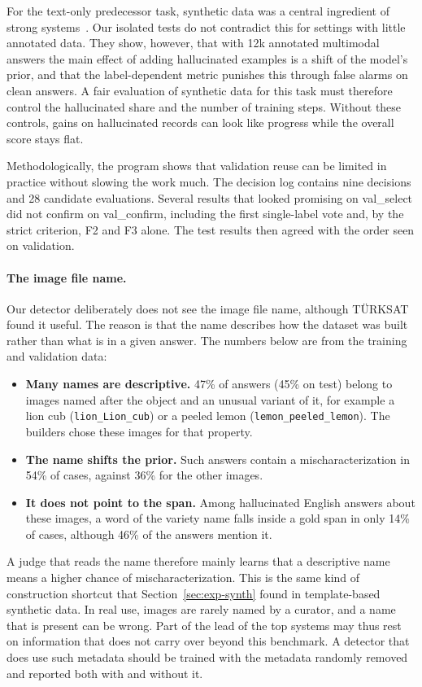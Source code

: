 For the text-only predecessor task, synthetic data was a central ingredient of strong systems~\cite{rykov-etal-2025-smurfcat,mo-etal-2025-team}. Our isolated tests do not contradict this for settings with little annotated data. They show, however, that with 12k annotated multimodal answers the main effect of adding hallucinated examples is a shift of the model's prior, and that the label-dependent metric punishes this through false alarms on clean answers. A fair evaluation of synthetic data for this task must therefore control the hallucinated share and the number of training steps. Without these controls, gains on hallucinated records can look like progress while the overall score stays flat.

Methodologically, the program shows that validation reuse can be limited in practice without slowing the work much. The decision log contains nine decisions and 28 candidate evaluations. Several results that looked promising on val\_select did not confirm on val\_confirm, including the first single-label vote and, by the strict criterion, F2 and F3 alone. The test results then agreed with the order seen on validation.

\paragraph{The image file name.}
Our detector deliberately does not see the image file name, although TÜRKSAT found it useful. The reason is that the name describes how the dataset was built rather than what is in a given answer. The numbers below are from the training and validation data:
\begin{itemize}
    \item \textbf{Many names are descriptive.} 47\% of answers (45\% on test) belong to images named after the object and an unusual variant of it, for example a lion cub (\texttt{lion\_Lion\_cub}) or a peeled lemon (\texttt{lemon\_peeled\_lemon}). The builders chose these images for that property.
    \item \textbf{The name shifts the prior.} Such answers contain a mischaracterization in 54\% of cases, against 36\% for the other images.
    \item \textbf{It does not point to the span.} Among hallucinated English answers about these images, a word of the variety name falls inside a gold span in only 14\% of cases, although 46\% of the answers mention it.
\end{itemize}
A judge that reads the name therefore mainly learns that a descriptive name means a higher chance of mischaracterization. This is the same kind of construction shortcut that Section~\ref{sec:exp-synth} found in template-based synthetic data. In real use, images are rarely named by a curator, and a name that is present can be wrong. Part of the lead of the top systems may thus rest on information that does not carry over beyond this benchmark. A detector that does use such metadata should be trained with the metadata randomly removed and reported both with and without it.

